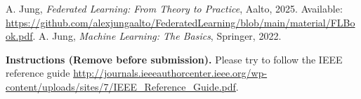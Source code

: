 \documentclass[9pt]{article}
\begin{document}
	\begin{thebibliography}{9}
		 A. Jung, \textit{Federated Learning: From Theory to Practice}, Aalto, 2025. Available: \url{https://github.com/alexjungaalto/FederatedLearning/blob/main/material/FLBook.pdf}.
		 A. Jung, \textit{Machine Learning: The Basics}, Springer, 2022.
	\end{thebibliography}
	{\bf Instructions (Remove before submission).} Please try to follow the IEEE reference guide \url{http://journals.ieeeauthorcenter.ieee.org/wp-content/uploads/sites/7/IEEE_Reference_Guide.pdf}.
	
\end{document}
